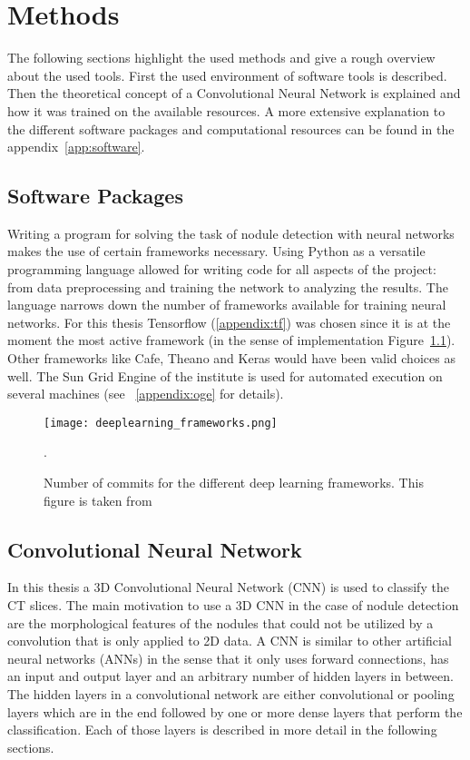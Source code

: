 \documentclass[main.tex]{subfiles}
\begin{document}
\chapter{Methods}\label{chap:methods}
The following sections highlight the used methods and give a rough overview about the used tools. First the used environment of software tools is described. Then the theoretical concept of a Convolutional Neural Network is explained and how it was trained on the available resources. A more extensive explanation to the different software packages and computational resources can be found in the appendix~\ref{app:software}.

\section{Software Packages}
Writing a program for solving the task of nodule detection with neural networks makes the use of certain frameworks necessary. Using Python as a versatile programming language allowed for writing code for all aspects of the project: from data preprocessing and training the network to analyzing the results. The language narrows down the number of frameworks available for training neural networks. For this thesis Tensorflow (\ref{appendix:tf}) was chosen since it is at the moment the most active framework (in the sense of implementation  Figure~\ref{fig:frameworks}). Other frameworks like Cafe, Theano and Keras would have been valid choices as well. The Sun Grid Engine of the institute is used for automated execution on several machines (see ~\ref{appendix:oge} for details).


\begin{figure}
\begin{center}
\texttt{[image: deeplearning\_frameworks.png]}
\end{center}
\caption{Number of commits for the different deep learning frameworks. This figure is taken from \cite{shapiro2017}}.
\label{fig:frameworks}
\end{figure}



\section{Convolutional Neural Network}
In this thesis a 3D Convolutional Neural Network (CNN) is used to classify the CT slices. The main motivation to use a 3D CNN in the case of nodule detection are the morphological features of the nodules that could not be utilized by a convolution that is only applied to 2D data. A CNN is similar to other artificial neural networks (ANNs) in the sense that it only uses forward connections, has an input and output layer and an arbitrary number of hidden layers in between. The hidden layers in a convolutional network are either convolutional or pooling layers which are in the end followed by one or more dense layers that perform the classification. Each of those layers is described in more detail in the following sections.
\end{document}
